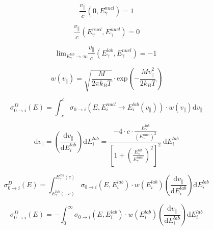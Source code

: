\documentclass{article}
\begin{document}
\begin{equation}
\frac{v_\parallel}{c} \left( 0, E_\gamma^{nucl} \right) = 1
\end{equation}

\begin{equation}
	\frac{v_\parallel}{c} \left( E_\gamma^{nucl}, E_\gamma^{nucl} \right) = 0
\end{equation}

\begin{equation}
\mathrm{lim}_{E_\gamma^{lab} \to \infty} \frac{v_\parallel}{c} \left( E_\gamma^{lab}, E_\gamma^{nucl} \right) = -1
\end{equation}

\begin{equation}
\label{maxwell_boltzmann_distribution}
w\left(v_\parallel \right) = \sqrt{\frac{M}{2 \pi k_B T}} \cdot \mathrm{exp} \left( -\frac{M v_\parallel^2}{2 k_B T} \right) 
\end{equation}

\begin{equation}
\label{pseudo_convolution_v}
\sigma^{D}_{0 \to i} (E) = \int_{-c}^{c} \sigma_{0 \to i} (E, E_i^{nucl} \to E_i^{lab}(v_\parallel)) \cdot w(v_\parallel) \mathrm{d} v_\parallel
\end{equation}

\begin{equation}
\label{substitute_v_E}
\mathrm{d} v_\parallel = \left( \frac{\mathrm{d} v_\parallel}{\mathrm{d} E_i^{lab}} \right) \mathrm{d} E_i^{lab} = \frac{- 4 \cdot c \cdot \frac{E_\gamma^{lab}}{\left( E_\gamma^{nucl} \right)^2}}{ \left[ 1 + \left( \frac{E_\gamma^{lab}}{E_\gamma^{nucl}} \right)^2 \right]^2} ~ \mathrm{d} E_i^{lab}
\end{equation}

\begin{equation}
\label{pseudo_convolution_E_0}
\sigma^{D}_{0 \to i} (E) = \int_{E_\gamma^{lab} \left(-c \right)}^{E_\gamma^{lab} \left(c \right)} \sigma_{0 \to i} (E, E_i^{lab}) \cdot w(E_i^{lab}) \left( \frac{\mathrm{d} v_\parallel}{\mathrm{d} E_i^{lab}} \right) \mathrm{d} E_i^{lab}
\end{equation}

\begin{equation}
\label{pseudo_convolution_E}
\sigma^{D}_{0 \to i} (E) = - \int_{0}^{\infty} \sigma_{0 \to i} (E, E_i^{lab}) \cdot w(E_i^{lab}) \left( \frac{\mathrm{d} v_\parallel}{\mathrm{d} E_i^{lab}} \right) \mathrm{d} E_i^{lab}
\end{equation}
\end{document}
